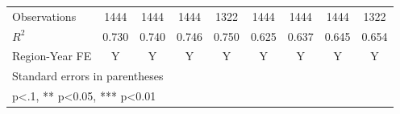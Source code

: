 \begin{table}[htbp]
\begin{tabular}{l*{8}{c}}
\midrule
Observations        &     1444   &     1444   &     1444   &     1322   &     1444   &     1444   &     1444   &     1322   \\
\(R^{2}\)           &    0.730   &    0.740   &    0.746   &    0.750   &    0.625   &    0.637   &    0.645   &    0.654   \\
Region-Year FE      &        Y   &        Y   &        Y   &        Y   &        Y   &        Y   &        Y   &        Y   \\
\bottomrule
\multicolumn{9}{l}{\footnotesize Standard errors in parentheses}\\
\multicolumn{9}{l}{\footnotesize * p<.1, ** p<0.05, *** p<0.01}\\
\end{tabular}
\end{table}

